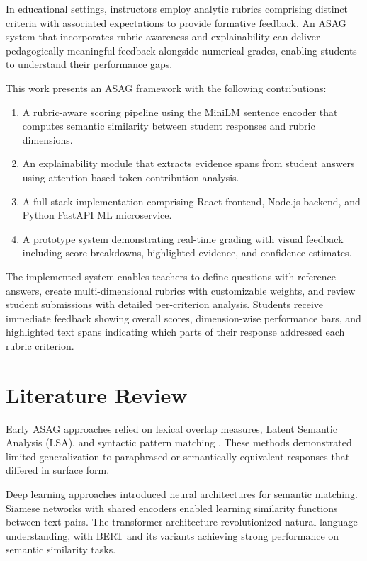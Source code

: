 \documentclass[conference]{IEEEtran}
\begin{document}
In educational settings, instructors employ analytic rubrics comprising distinct criteria with associated expectations to provide formative feedback. An ASAG system that incorporates rubric awareness and explainability can deliver pedagogically meaningful feedback alongside numerical grades, enabling students to understand their performance gaps.

This work presents an ASAG framework with the following contributions:
\begin{enumerate}
    \item A rubric-aware scoring pipeline using the MiniLM sentence encoder that computes semantic similarity between student responses and rubric dimensions.
    \item An explainability module that extracts evidence spans from student answers using attention-based token contribution analysis.
    \item A full-stack implementation comprising React frontend, Node.js backend, and Python FastAPI ML microservice.
    \item A prototype system demonstrating real-time grading with visual feedback including score breakdowns, highlighted evidence, and confidence estimates.
\end{enumerate}

The implemented system enables teachers to define questions with reference answers, create multi-dimensional rubrics with customizable weights, and review student submissions with detailed per-criterion analysis. Students receive immediate feedback showing overall scores, dimension-wise performance bars, and highlighted text spans indicating which parts of their response addressed each rubric criterion.

\section{Literature Review}
Early ASAG approaches relied on lexical overlap measures, Latent Semantic Analysis (LSA), and syntactic pattern matching \cite{asag_survey}. These methods demonstrated limited generalization to paraphrased or semantically equivalent responses that differed in surface form.

Deep learning approaches introduced neural architectures for semantic matching. Siamese networks with shared encoders enabled learning similarity functions between text pairs. The transformer architecture \cite{sbert} revolutionized natural language understanding, with BERT and its variants achieving strong performance on semantic similarity tasks.
\end{document}
